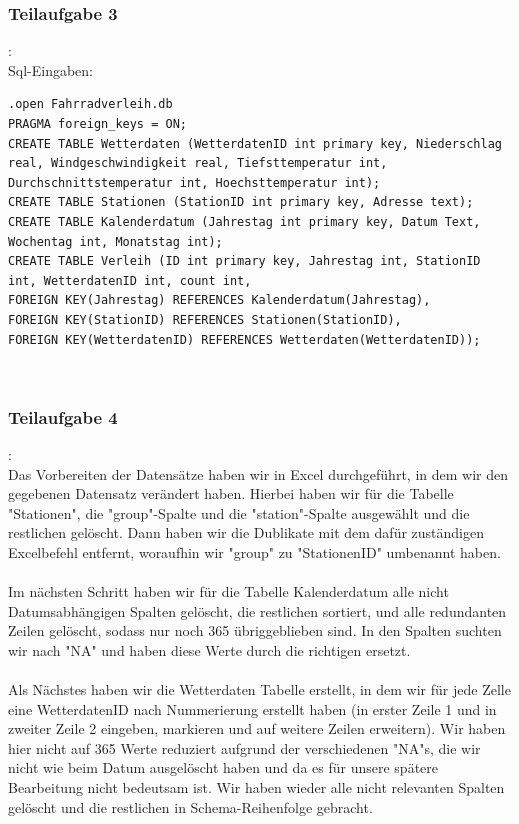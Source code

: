 \documentclass[a4paper,12pt]{article}
\begin{document}
\subsubsection{Teilaufgabe 3}:\\
Sql-Eingaben: 
\begin{lstlisting}
.open Fahrradverleih.db
PRAGMA foreign_keys = ON;
CREATE TABLE Wetterdaten (WetterdatenID int primary key, Niederschlag real, Windgeschwindigkeit real, Tiefsttemperatur int, Durchschnittstemperatur int, Hoechsttemperatur int);
CREATE TABLE Stationen (StationID int primary key, Adresse text);
CREATE TABLE Kalenderdatum (Jahrestag int primary key, Datum Text, Wochentag int, Monatstag int);
CREATE TABLE Verleih (ID int primary key, Jahrestag int, StationID int, WetterdatenID int, count int, 
FOREIGN KEY(Jahrestag) REFERENCES Kalenderdatum(Jahrestag), 
FOREIGN KEY(StationID) REFERENCES Stationen(StationID), 
FOREIGN KEY(WetterdatenID) REFERENCES Wetterdaten(WetterdatenID));
\end{lstlisting}
\\ \subsubsection{Teilaufgabe 4}: \\
Das Vorbereiten der Datensätze haben wir in Excel durchgeführt, in dem wir den gegebenen Datensatz verändert haben. Hierbei haben wir für die Tabelle "Stationen", die "group"-Spalte und die "station"-Spalte ausgewählt und die restlichen gelöscht. Dann haben wir die Dublikate mit dem dafür zuständigen Excelbefehl entfernt, woraufhin wir "group" zu "StationenID" umbenannt haben. \\ \\
Im nächsten Schritt haben wir für die Tabelle Kalenderdatum alle nicht Datumsabhängigen Spalten gelöscht, die restlichen sortiert, und alle redundanten Zeilen gelöscht, sodass nur noch 365 übriggeblieben sind. In den Spalten suchten wir nach "NA" und haben diese Werte durch die richtigen ersetzt.\\ \\
Als Nächstes haben wir die Wetterdaten Tabelle erstellt, in dem wir für jede Zelle eine WetterdatenID nach Nummerierung erstellt haben (in erster Zeile 1 und in zweiter Zeile 2 eingeben, markieren und auf weitere Zeilen erweitern). Wir haben hier nicht auf 365 Werte reduziert aufgrund der verschiedenen "NA"s, die wir nicht wie beim Datum ausgelöscht haben und da es für unsere spätere Bearbeitung nicht bedeutsam ist. Wir haben wieder alle nicht relevanten Spalten gelöscht und die restlichen in Schema-Reihenfolge gebracht.\\ \\
\end{document}
